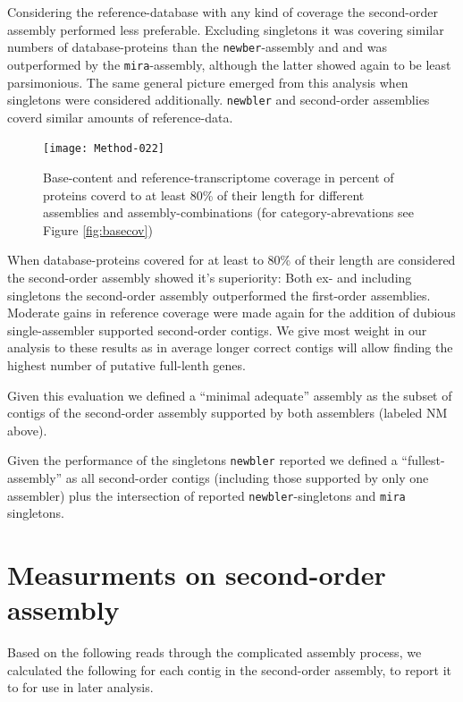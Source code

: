 \documentclass[12pt,a4paper]{article}
\begin{document}
Considering the reference-database with any kind of coverage the
second-order assembly performed less preferable. Excluding singletons
it was covering similar numbers of database-proteins than the
\texttt{newber}-assembly and and was outperformed by the
\texttt{mira}-assembly, although the latter showed again to be least
parsimonious. The same general picture emerged from this analysis when
singletons were considered additionally. \texttt{newbler} and
second-order assemblies coverd similar amounts of reference-data.

\begin{figure}[H]

\texttt{[image: Method-022]}
\caption{Base-content and reference-transcriptome coverage in percent
  of proteins coverd to at least 80\% of their length for different
  assemblies and assembly-combinations (for category-abrevations see
  Figure \ref{fig:basecov})}
\label{fig:prot80cov}
\end{figure}

When database-proteins covered for at least to 80\% of their length
are considered the second-order assembly showed it's superiority: Both
ex- and including singletons the second-order assembly outperformed
the first-order assemblies. Moderate gains in reference coverage were
made again for the addition of dubious single-assembler supported
second-order contigs. We give most weight in our analysis to these
results as in average longer correct contigs will allow finding the
highest number of putative full-lenth genes.

Given this evaluation we defined a ``minimal adequate'' assembly as
the subset of contigs of the second-order assembly supported by both
assemblers (labeled NM above).

Given the performance of the singletons \texttt{newbler} reported we
defined a ``fullest-assembly'' as all second-order contigs (including
those supported by only one assembler) plus the intersection of
reported \texttt{newbler}-singletons and \texttt{mira} singletons.

\section{Measurments on second-order assembly}

Based on the following reads through the complicated assembly process,
we calculated the following for each contig in the second-order
assembly, to report it to for use in later analysis.
\end{document}
